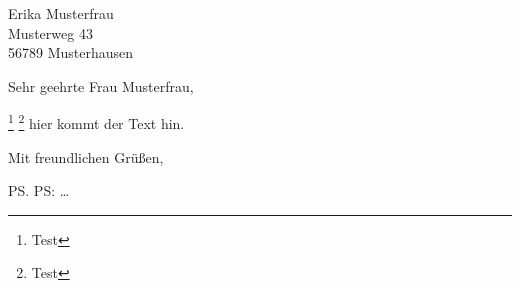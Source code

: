 \documentclass{HUBerlin-letter}
\begin{document}
\begin{letter}{%
  Erika Musterfrau\\
  Musterweg 43\\
  56789 Musterhausen%
}

\opening{Sehr geehrte Frau Musterfrau,}
\blindtext
\footnote{Test}
\clearpage
\blindtext
\footnote{Test}
hier kommt der Text hin.

\closing{Mit freundlichen Grüßen,}

\ps PS: \dots



\end{letter}
\end{document}

